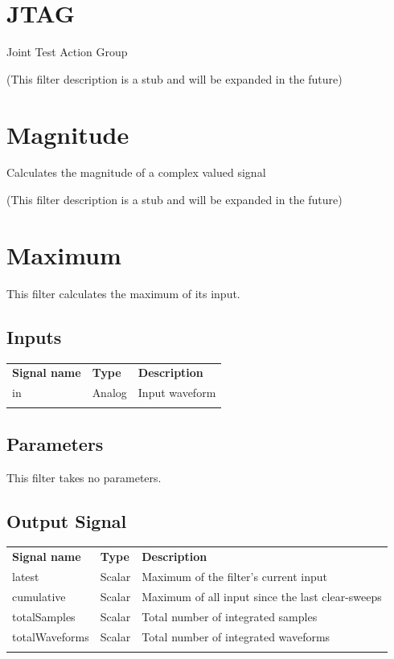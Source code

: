 \section{JTAG}

Joint Test Action Group

(This filter description is a stub and will be expanded in the future)

\pagebreak
\section{Magnitude}

Calculates the magnitude of a complex valued signal

(This filter description is a stub and will be expanded in the future)

\pagebreak
\section{Maximum}
\label{filter:maximum}

This filter calculates the maximum of its input.

\subsection{Inputs}
\begin{tabularx}{16cm}{llX}
\thickhline
\textbf{Signal name} & \textbf{Type} & \textbf{Description} \\
\thickhline
in & Analog & Input waveform \\
\thickhline
\end{tabularx}

\subsection{Parameters}

This filter takes no parameters.

\subsection{Output Signal}

\begin{tabularx}{16cm}{llX}
\thickhline
\textbf{Signal name} & \textbf{Type} & \textbf{Description} \\
\thickhline
latest & Scalar & Maximum of the filter's current input \\
\thinhline
cumulative & Scalar & Maximum of all input since the last clear-sweeps\\
\thinhline
totalSamples & Scalar & Total number of integrated samples \\
\thinhline
totalWaveforms & Scalar & Total number of integrated waveforms \\
\thickhline
\end{tabularx}

